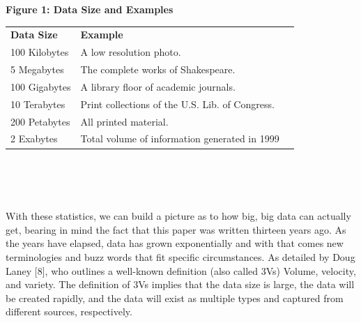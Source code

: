 \documentclass[10pt,journal,compsoc]{IEEEtran}
\begin{document}
\begin{algoBox}{\textbf{Figure 1: Data Size and Examples}}
	\begin{tabular}{lp{}r}
		\bfseries Data Size & \bfseries Example &
		\bfseries  \\[1ex]
		100 Kilobytes & A low resolution photo. \\
		5 Megabytes & The complete works of Shakespeare. \\
		100 Gigabytes & A library floor of academic journals. \\
		10 Terabytes & Print collections of the U.S. Lib. of Congress. \\
		200 Petabytes & All printed material. \\
		2 Exabytes & Total volume of information generated in 1999
	\end{tabular}\\\\\\
\end{algoBox}


With these statistics, we can build a picture as to how big, big data can actually get, bearing in mind the fact that this paper was written thirteen years ago. As the years have elapsed, data has grown exponentially and with that comes new terminologies and buzz words that fit specific circumstances. As detailed by Doug Laney [8], who outlines a well-known definition (also called 3Vs) Volume, velocity, and variety. The definition of 3Vs implies that the data size is large, the data will be created rapidly, and the data will exist as multiple types and captured from different sources, respectively.
\end{document}
